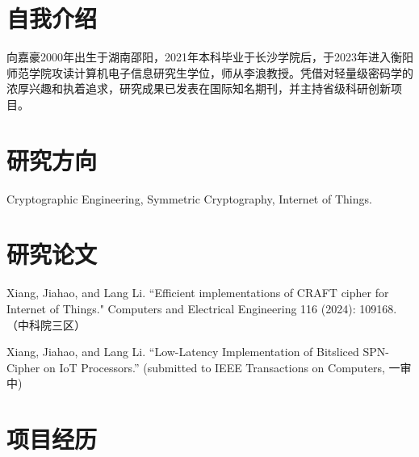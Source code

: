 \documentclass[11pt,a4paper,sans]{moderncv}
\begin{document}
\renewcommand*{\footrulewidth}{0pt}
\cfoot{}
\rfoot{\today}

\makecvtitle

\section{自我介绍}
向嘉豪2000年出生于湖南邵阳，2021年本科毕业于长沙学院后，于2023年进入衡阳师范学院攻读计算机电子信息研究生学位，师从李浪教授。凭借对轻量级密码学的浓厚兴趣和执着追求，研究成果已发表在国际知名期刊，并主持省级科研创新项目。

\section{研究方向}
Cryptographic Engineering, Symmetric Cryptography, Internet of Things.

\section{研究论文}
Xiang, Jiahao, and Lang Li. ``Efficient implementations of CRAFT cipher for Internet of Things." Computers and Electrical Engineering 116 (2024): 109168. （中科院三区）

Xiang, Jiahao, and Lang Li. ``Low-Latency Implementation of Bitsliced SPN-Cipher on IoT Processors.'' (submitted to IEEE Transactions on Computers, 一审中)

\section{项目经历}
\end{document}
